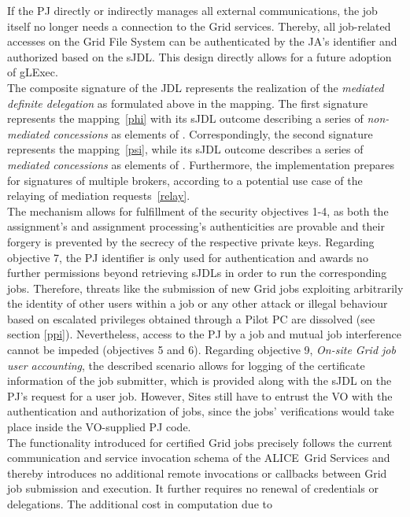 \documentclass[10pt]{iopart}
\newcommand{\alice}{ALICE}
\begin{document}
If the PJ directly or indirectly manages all external communications,
the job itself no longer needs a
connection to the Grid services. Thereby, all job-related accesses on
the Grid File System can be authenticated by the JA's identifier and authorized
based on the sJDL.
This design directly allows for a future adoption of gLExec.\\
The composite signature of the JDL represents the realization of the
\textit{mediated definite delegation} as formulated above in the
 mapping. The first signature represents the 
mapping~\eqref{phi} with its sJDL outcome describing a series of
\textit{non-mediated concessions} as
elements of . Correspondingly, the second signature represents the 
mapping~\eqref{psi}, while its sJDL outcome
describes a series of \textit{mediated concessions} as elements of .
Furthermore, the implementation prepares for signatures of multiple brokers, 
according to a potential use case of the relaying of mediation requests~\eqref{relay}.\\
The mechanism allows for fulfillment of the security objectives 1-4, as
both the assignment's and assignment processing's
authenticities are provable and their forgery is prevented by the secrecy of the 
respective private keys. Regarding objective 7, the PJ identifier is only used
for authentication and awards no further permissions beyond
retrieving sJDLs in order to run the corresponding jobs. Therefore,
threats like the submission of new Grid jobs exploiting arbitrarily the identity of other users
within a job or any other attack or illegal behaviour
based on escalated privileges obtained through a Pilot PC are dissolved
(see section \ref{ppi}). Nevertheless, access to the PJ by a job and mutual job
interference cannot be impeded (objectives 5 and 6).
Regarding objective 9, \textit{On-site Grid job user accounting}, the
described scenario allows for logging of the certificate information of the
job submitter, which is provided along with the sJDL on the PJ's
request for a user job. However, Sites still have to
entrust the VO with the authentication and authorization of jobs, since the jobs'
verifications would take place inside the VO-supplied PJ code.\\
The functionality introduced for certified Grid jobs precisely follows
the current communication and service invocation schema of the \alice\ Grid Services
and thereby introduces no
additional remote invocations or callbacks between Grid job submission and
execution. It further requires no renewal of credentials or delegations.
The additional cost in computation due to
\end{document}
